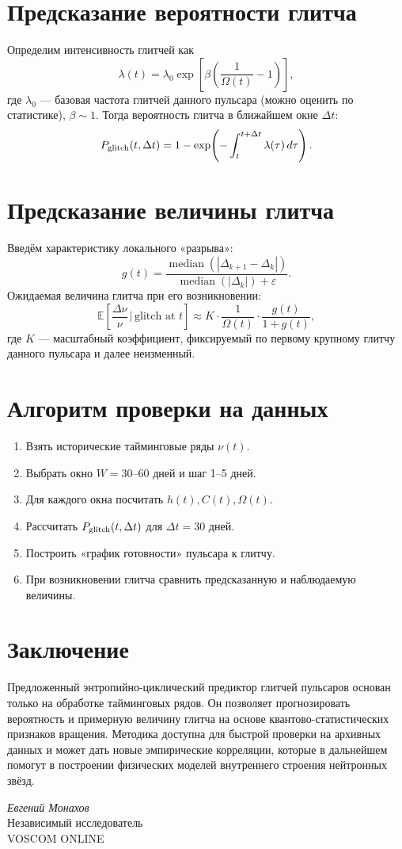 \documentclass[a4paper,12pt]{article}
\begin{document}
\section{Предсказание вероятности глитча}
Определим интенсивность глитчей как
\[
\lambda(t) = \lambda_0 \exp\!\left[\beta \left(\frac{1}{\Omega(t)} - 1\right)\right],
\]
где $\lambda_0$ --- базовая частота глитчей данного пульсара (можно оценить по статистике), 
$\beta \sim 1$. Тогда вероятность глитча в ближайшем окне $\Delta t$:
\[
P_{\rm glitch}(t,\Delta t) = 1 - \exp\!\left(-\int_t^{t+\Delta t} \lambda(\tau) \, d\tau\right).
\]

\section{Предсказание величины глитча}
Введём характеристику локального «разрыва»:
\[
g(t) = \frac{\operatorname{median}(|\Delta_{k+1}-\Delta_k|)}{\operatorname{median}(|\Delta_k|)+\varepsilon}.
\]
Ожидаемая величина глитча при его возникновении:
\[
\mathbb{E}\!\left[\frac{\Delta \nu}{\nu}\,\big|\,\text{glitch at }t\right] \approx 
K \cdot \frac{1}{\Omega(t)} \cdot \frac{g(t)}{1+g(t)},
\]
где $K$ --- масштабный коэффициент, фиксируемый по первому крупному глитчу данного пульсара 
и далее неизменный.

\section{Алгоритм проверки на данных}
\begin{enumerate}
\item Взять исторические тайминговые ряды $\nu(t)$.
\item Выбрать окно $W=30$--$60$ дней и шаг 1--5 дней.
\item Для каждого окна посчитать $h(t), C(t), \Omega(t)$.
\item Рассчитать $P_{\rm glitch}(t,\Delta t)$ для $\Delta t=30$ дней.
\item Построить «график готовности» пульсара к глитчу.
\item При возникновении глитча сравнить предсказанную и наблюдаемую величины.
\end{enumerate}

\section{Заключение}
Предложенный энтропийно-циклический предиктор глитчей пульсаров основан только на 
обработке тайминговых рядов. 
Он позволяет прогнозировать вероятность и примерную величину глитча на 
основе квантово-статистических признаков вращения. 
Методика доступна для быстрой проверки на архивных данных и может дать 
новые эмпирические корреляции, которые в дальнейшем помогут в построении 
физических моделей внутреннего строения нейтронных звёзд.

\vspace{2em}
\noindent
\textit{Евгений Монахов} \\
Независимый исследователь \\
VOSCOM ONLINE
\end{document}
